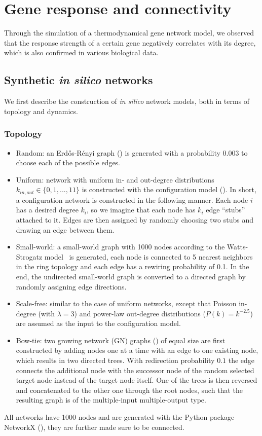 \section{Gene response and connectivity}
Through the simulation of a thermodynamical gene network model, we observed that the response strength of a certain gene negatively correlates with its degree, which is also 
confirmed in various biological data.

\subsection{Synthetic \emph{in silico} networks}
We first describe the construction of \emph{in silico}
network models, both in terms of topology and dynamics.

\subsubsection{Topology}
\begin{itemize}
\item Random: an Erd\H{o}s-R\'enyi graph (\citealp{Erdos1959}) is generated with a probability
  $0.003$ to choose each of the possible edges.
\item Uniform: network with uniform in- and out-degree distributions $k_{in,out} \in 
  \{0,1,...,11\}$ is constructed 
  with the configuration model (\citealp{Newman2001}). 
  In short, a configuration network 
  is constructed in the following manner. Each node $i$ has a desired degree $k_i$, 
  so we imagine that each node has $k_i$ edge ``stubs'' attached to it. Edges are 
  then assigned by randomly choosing two stubs and drawing an edge between them.
\item Small-world: a small-world graph with 1000 nodes 
according to the 
Watts-Strogatz model~\citep{Watts1998} is generated, 
each node is connected
to 5 nearest neighbors in the ring topology and each edge
has a rewiring probability of 0.1. In the end, the 
undirected small-world graph is converted to a directed
graph by randomly assigning edge directions.
\item Scale-free: similar to the case of uniform networks,
except that Poisson in-degree (with $\lambda = 3$) and power-law 
  out-degree distributions ($P(k) = k^{-2.5}$) are assumed as the input
  to the configuration model.
\item Bow-tie: two growing network (GN) graphs 
  (\citealp{Krapivsky2001}) of equal size are first 
  constructed by adding nodes one at a time with an edge to one existing node, 
  which results in two directed trees. With redirection probability $0.1$ the edge
  connects the additional node with the successor node of the random selected target
  node instead of the target node itself. One of the trees is then reversed and 
  concatenated to the other one through the root nodes, such that the resulting
  graph is of the multiple-input multiple-output type.
\end{itemize}
All networks have 1000 nodes and are generated with the Python package NetworkX 
(\citealp{Hagberg2008}), they are further made sure to be connected.

